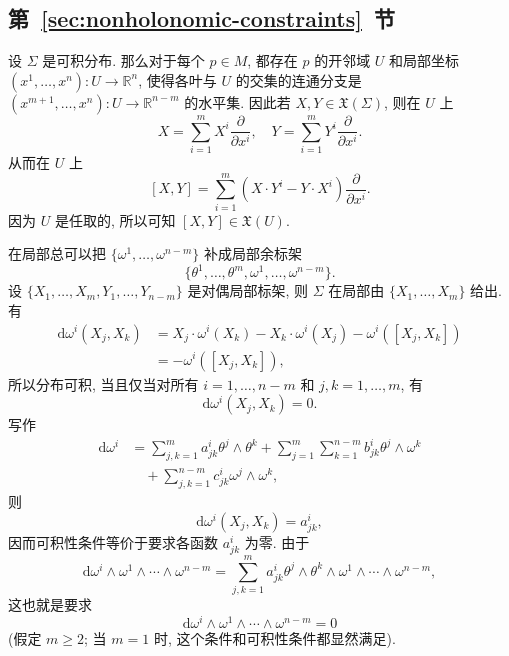 \subsection{\texorpdfstring{第~\ref{sec:nonholonomic-constraints}~节}{非完整约束}}\label{subsec:solutions-nonholonomic-constraints}

\begin{description}[font=\normalfont,leftmargin=2em,labelwidth=1.5em]
设 $\Sigma$ 是可积分布. 那么对于每个 $p\in M$, 都存在 $p$ 的开邻域 $U$ 和局部坐标 $(x^1,\ldots,x^n):U\to\mathbb{R}^n$, 使得各叶与 $U$ 的交集的连通分支是 $(x^{m+1},\ldots,x^n):U\to\mathbb{R}^{n-m}$ 的水平集. 因此若 $X,Y\in\mathfrak X(\Sigma)$, 则在 $U$ 上
\[
  X=\sum_{i=1}^m X^i\frac{\partial}{\partial x^i},\quad
  Y=\sum_{i=1}^m Y^i\frac{\partial}{\partial x^i}.
\]
从而在 $U$ 上
\[
  [X,Y]=\sum_{i=1}^m(X\cdot Y^i-Y\cdot X^i)\frac{\partial}{\partial x^i}.
\]
因为 $U$ 是任取的, 所以可知 $[X,Y]\in\mathfrak X(U)$.

在局部总可以把 $\{\omega^1,\ldots,\omega^{n-m}\}$ 补成局部余标架
\[
  \{\theta^1,\ldots,\theta^m,\omega^1,\ldots,\omega^{n-m}\}.
\]
设 $\{X_1,\ldots,X_m,Y_1,\ldots,Y_{n-m}\}$ 是对偶局部标架, 则 $\Sigma$ 在局部由 $\{X_1,\ldots,X_m\}$ 给出. 有
\begin{align*}
  \mathrm{d}\omega^i(X_j,X_k)
  &=X_j\cdot\omega^i(X_k)-X_k\cdot\omega^i(X_j)-\omega^i([X_j,X_k])\\
  &=-\omega^i([X_j,X_k]),
\end{align*}
所以分布可积, 当且仅当对所有 $i=1,\ldots,n-m$ 和 $j,k=1,\ldots,m$, 有
\[
  \mathrm{d}\omega^i(X_j,X_k)=0.
\]
写作
\begin{align*}
  \mathrm{d}\omega^i
  &=\sum_{j,k=1}^m a^i_{jk}\theta^j\wedge\theta^k
    +\sum_{j=1}^m\sum_{k=1}^{n-m}b^i_{jk}\theta^j\wedge\omega^k\\
  &\quad+\sum_{j,k=1}^{n-m}c^i_{jk}\omega^j\wedge\omega^k,
\end{align*}
则
\[
  \mathrm{d}\omega^i(X_j,X_k)=a^i_{jk},
\]
因而可积性条件等价于要求各函数 $a^i_{jk}$ 为零. 由于
\[
  \mathrm{d}\omega^i\wedge\omega^1\wedge\cdots\wedge\omega^{n-m}
    =\sum_{j,k=1}^m a^i_{jk}\theta^j\wedge\theta^k\wedge\omega^1\wedge\cdots\wedge\omega^{n-m},
\]
这也就是要求
\[
  \mathrm{d}\omega^i\wedge\omega^1\wedge\cdots\wedge\omega^{n-m}=0
\]
(假定 $m\ge2$; 当 $m=1$ 时, 这个条件和可积性条件都显然满足).


\end{description}

